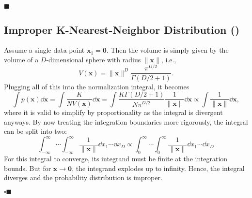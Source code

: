 \documentclass[11pt, a4paper]{scrartcl}
\renewcommand{\vec}[1]{\bm{#1}}
\newcommand{\eot}{\hfill\(\blacksquare\)}
\newcommand{\qedeot}{\hfill\(\square\blacksquare\)}
\newcommand{\diffstar}{\texorpdfstring{\raisebox{-1pt}{\resizebox{!}{8pt}{\(\star\)}}}{*}}
\newcommand{\onestar}  {(\diffstar)}
\begin{document}
			\eot

		\subsection{Improper K-Nearest-Neighbor Distribution  \onestar}
			Assume a single data point \( \vec{x}_1 = \vec{0} \). Then the volume is simply given by the volume of a \(D\)-dimensional sphere with radius \( \lVert \vec{x} \rVert \), i.e.,
			\begin{equation}
				V(\vec{x}) = \lVert \vec{x} \rVert^D \frac{\pi^{D/2}}{\Gamma(D/2 + 1)}.
			\end{equation}
			Plugging all of this into the normalization integral, it becomes
			\begin{equation}
				\int\! p(\vec{x}) \dd{\vec{x}}
					= \int\! \frac{K}{N V(\vec{x})} \dd{\vec{x}}
					= \int\! \frac{K \Gamma(D/2 + 1)}{N \pi^{D/2}} \frac{1}{\lVert \vec{x} \rVert} \dd{\vec{x}}
					\propto \int\! \frac{1}{\lVert \vec{x} \rVert} \dd{\vec{x}},
			\end{equation}
			where it is valid to simplify by proportionality as the integral is divergent anyways. By now treating the integration boundaries more rigorously, the integral can be split into two:
			\begin{equation}
				\int_{-\infty}^{\infty}\! \cdots \int_{-\infty}^{\infty} \frac{1}{\lVert \vec{x} \rVert} \dd{x_1} \cdots \dd{x_D}
					\propto \int_{0}^{\infty}\! \cdots \int_{0}^{\infty} \frac{1}{\lVert \vec{x} \rVert} \dd{x_1} \cdots \dd{x_D}
			\end{equation}
			For this integral to converge, its integrand must be finite at the integration bounds. But for \( \vec{x} \to \vec{0} \), the integrand explodes up to infinity. Hence, the integral diverges and the probability distribution is improper.

			\qedeot
\end{document}
